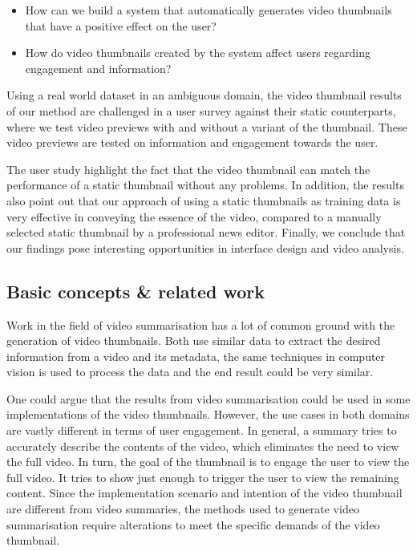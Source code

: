\documentclass{../resources/sig-alternate-05-2015}
\begin{document}
\begin{itemize}
	\item How can we build a system that automatically generates video thumbnails that have a positive effect on the user?
	\item How do video thumbnails created by the system affect users regarding engagement and information?
\end{itemize}

Using a real world dataset in an ambiguous domain, the video thumbnail results of our method are challenged in a user survey against their static counterparts, where we test video previews with and without a variant of the thumbnail. These video previews are tested on information and engagement towards the user.

The user study highlight the fact that the video thumbnail can match the performance of a static thumbnail without any problems. In addition, the results also point out that our approach of using a static thumbnails as training data is very effective in conveying the essence of the video, compared to a manually selected static thumbnail by a professional news editor. Finally, we conclude that our findings pose interesting opportunities in interface design and video analysis.

\subsection{Basic concepts \& related work}


\label{related work}

Work in the field of video summarisation has a lot of common ground with the generation of video thumbnails. Both use similar data to extract the desired information from a video and its metadata, the same techniques in computer vision is used to process the data and the end result could be very similar. 

One could argue that the results from video summarisation could be used in some implementations of the video thumbnails. However, the use cases in both domains are vastly different in terms of user engagement. In general, a summary tries to accurately describe the contents of the video, which eliminates the need to view the full video. In turn, the goal of the thumbnail is to engage the user to view the full video. It tries to show just enough to trigger the user to view the remaining content. Since the implementation scenario and intention of the video thumbnail are different from video summaries, the methods used to generate video summarisation require alterations to meet the specific demands of the video thumbnail.
\end{document}
